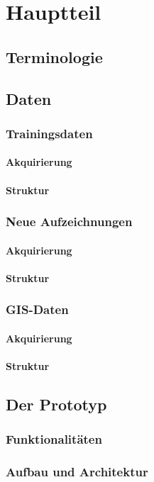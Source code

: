 \chapter{Hauptteil}

\section{Terminologie}
\section{Daten}
\subsection{Trainingsdaten}
\subsubsection{Akquirierung}
\subsubsection{Struktur}
\subsection{Neue Aufzeichnungen}
\subsubsection{Akquirierung}
\subsubsection{Struktur}
\subsection{GIS-Daten}
\subsubsection{Akquirierung}
\subsubsection{Struktur}
\section{Der Prototyp}
\subsection{Funktionalitäten}
\subsection{Aufbau und Architektur}

